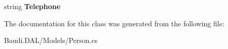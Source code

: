 \begin{DoxyCompactItemize}
\item 
\hypertarget{class_baudi_1_1_d_a_l_1_1_models_1_1_person_a3c5652915162a177a7deb9665b0a2f74}{}string {\bfseries Telephone}\label{class_baudi_1_1_d_a_l_1_1_models_1_1_person_a3c5652915162a177a7deb9665b0a2f74}

\end{DoxyCompactItemize}


The documentation for this class was generated from the following file\+:\begin{DoxyCompactItemize}
\item 
Baudi.\+D\+A\+L/\+Models/Person.\+cs\end{DoxyCompactItemize}
